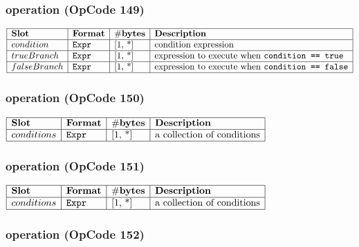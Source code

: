 \subsubsection{ operation (OpCode 149)}

\noindent
\(\begin{array}{| l | l | l | l |}
    \hline
    \bf{Slot} & \bf{Format} & \bf{\#bytes} & \bf{Description} \\
    \hline
         condition & \lst{Expr} & \text{[1, *]} & \text{condition expression} \\
    \hline
           trueBranch & \lst{Expr} & \text{[1, *]} & \text{expression to execute when \lst{condition == true}} \\
    \hline
           falseBranch & \lst{Expr} & \text{[1, *]} & \text{expression to execute when \lst{condition == false}} \\
    \hline
      
\end{array}\)
       

\subsubsection{ operation (OpCode 150)}

\noindent
\(\begin{array}{| l | l | l | l |}
    \hline
    \bf{Slot} & \bf{Format} & \bf{\#bytes} & \bf{Description} \\
    \hline
         conditions & \lst{Expr} & \text{[1, *]} & \text{a collection of conditions} \\
    \hline
      
\end{array}\)
       

\subsubsection{ operation (OpCode 151)}

\noindent
\(\begin{array}{| l | l | l | l |}
    \hline
    \bf{Slot} & \bf{Format} & \bf{\#bytes} & \bf{Description} \\
    \hline
         conditions & \lst{Expr} & \text{[1, *]} & \text{a collection of conditions} \\
    \hline
      
\end{array}\)
       

\subsubsection{ operation (OpCode 152)}

